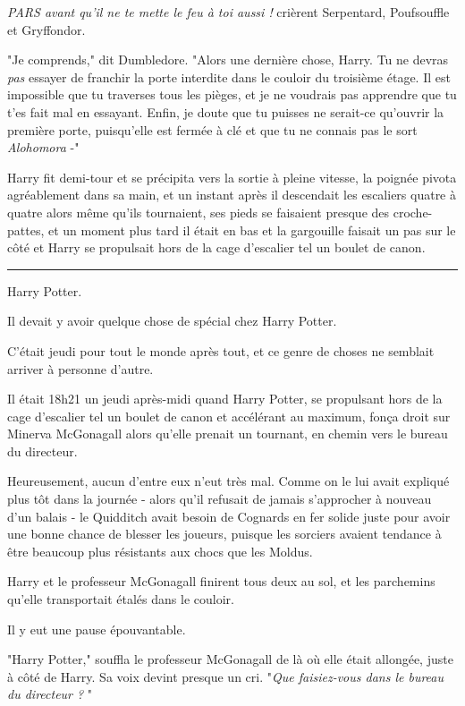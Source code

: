 \emph{PARS avant qu'il ne te mette le feu à toi aussi !}  crièrent Serpentard, Poufsouffle et Gryffondor.

"Je comprends," dit Dumbledore. "Alors une dernière chose, Harry. Tu ne devras \emph{pas}  essayer de franchir la porte interdite dans le couloir du troisième étage. Il est impossible que tu traverses tous les pièges, et je ne voudrais pas apprendre que tu t'es fait mal en essayant. Enfin, je doute que tu puisses ne serait-ce qu'ouvrir la première porte, puisqu'elle est fermée à clé et que tu ne connais pas le sort \emph{Alohomora } -"

Harry fit demi-tour et se précipita vers la sortie à pleine vitesse, la poignée pivota agréablement dans sa main, et un instant après il descendait les escaliers quatre à quatre alors même qu'ils tournaient, ses pieds se faisaient presque des croche-pattes, et un moment plus tard il était en bas et la gargouille faisait un pas sur le côté et Harry se propulsait hors de la cage d'escalier tel un boulet de canon.
\par\noindent\rule{\textwidth}{0.4pt}
Harry Potter.

Il devait y avoir quelque chose de spécial chez Harry Potter.

C'était jeudi pour tout le monde après tout, et ce genre de choses ne semblait arriver à personne d'autre.

Il était 18h21 un jeudi après-midi quand Harry Potter, se propulsant hors de la cage d'escalier tel un boulet de canon et accélérant au maximum, fonça droit sur Minerva McGonagall alors qu'elle prenait un tournant, en chemin vers le bureau du directeur.

Heureusement, aucun d'entre eux n'eut très mal. Comme on le lui avait expliqué plus tôt dans la journée - alors qu'il refusait de jamais s'approcher à nouveau d'un balais - le Quidditch avait besoin de Cognards en fer solide juste pour avoir une bonne chance de blesser les joueurs, puisque les sorciers avaient tendance à être beaucoup plus résistants aux chocs que les Moldus.

Harry et le professeur McGonagall finirent tous deux au sol, et les parchemins qu'elle transportait étalés dans le couloir.

Il y eut une pause épouvantable.

"Harry Potter," souffla le professeur McGonagall de là où elle était allongée, juste à côté de Harry. Sa voix devint presque un cri. "\emph{Que faisiez-vous dans le bureau du directeur ?} "

